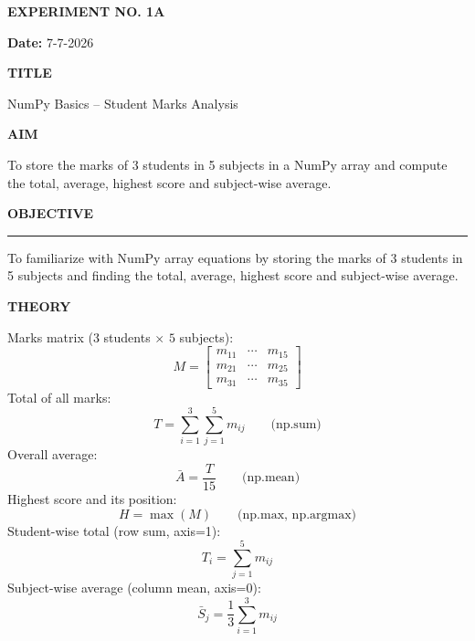 \documentclass[11pt,twoside]{article}
\newcommand{\expheading}[1]{{\fontsize{14}{17}\selectfont\textbf{#1}\par}}
\newcommand{\fullrule}{\noindent\rule{\textwidth}{0.6pt}\par}
\newcommand{\tooddpage}{\clearpage\ifodd\value{page}\else\null\thispagestyle{empty}\newpage\fi}
\begin{document}
\tooddpage %

{\setlength{\parskip}{1pt}\setlength{\abovedisplayskip}{2pt}\setlength{\belowdisplayskip}{2pt}
\begin{center}
\expheading{EXPERIMENT NO. 1A}
\end{center}
\vspace{2pt}

\noindent\textbf{Date:} 7-7-2026\par
\vspace{6pt}

\expheading{TITLE}
\vspace{4pt}
\noindent NumPy Basics -- Student Marks Analysis\par
\vspace{4pt}

\expheading{AIM}
\vspace{4pt}
\noindent To store the marks of 3 students in 5 subjects in a NumPy array and compute the total, average, highest score and subject-wise average. \par
\vspace{4pt}

\expheading{OBJECTIVE}
\vspace{2pt}
\fullrule
\vspace{4pt}
\noindent To familiarize with NumPy array equations by storing the marks of 3 students in 5 subjects and finding the total, average, highest score and subject-wise average. \par
\vspace{4pt}

\expheading{THEORY}
\vspace{4pt}
Marks matrix ($3$ students $\times$ $5$ subjects):
\[M=\begin{bmatrix}m_{11} & \cdots & m_{15}\\m_{21} & \cdots & m_{25}\\m_{31} & \cdots & m_{35}\end{bmatrix}\]
Total of all marks:
\[T=\sum_{i=1}^{3}\sum_{j=1}^{5}m_{ij}\qquad\text{(np.sum)}\]
Overall average:
\[\bar{A}=\frac{T}{15}\qquad\text{(np.mean)}\]
Highest score and its position:
\[H=\max(M)\qquad\text{(np.max, np.argmax)}\]
Student-wise total (row sum, axis=1):
\[T_i=\sum_{j=1}^{5}m_{ij}\]
Subject-wise average (column mean, axis=0):
\[\bar{S}_j=\frac{1}{3}\sum_{i=1}^{3}m_{ij}\]
\vspace{4pt}

}
\end{document}
